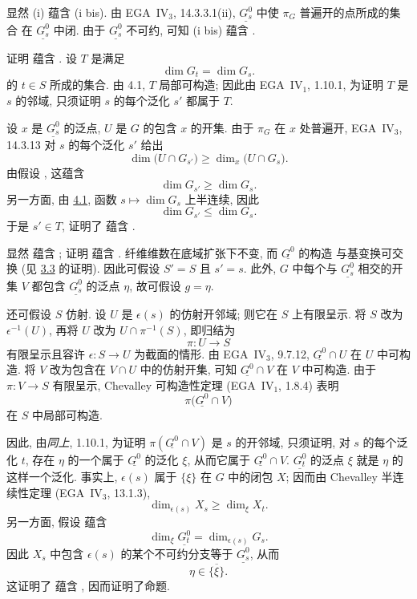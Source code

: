 显然 (i) 蕴含 (i bis). 由 EGA~IV\(_3\), 14.3.3.1(ii),
\(\underline{G_s^0}\) 中使 \(\pi_G\) 普遍开的点所成的集合
在 \(\underline{G_s^0}\) 中闭. 由于 \(\underline{G_s^0}\) 不可约,
可知 (i bis) 蕴含 .

证明  蕴含
.
设 \(T\) 是满足
\[
  \dim G_t=\dim G_s.
\]
的 \(t\in S\) 所成的集合. 由 4.1, \(T\) 局部可构造;
因此由 EGA~IV\(_1\), 1.10.1, 为证明 \(T\) 是 \(s\) 的邻域,
只须证明 \(s\) 的每个泛化 \(s'\) 都属于 \(T\).

设 \(x\) 是 \(\underline{G_s^0}\) 的泛点,
\(U\) 是 \(G\) 的包含 \(x\) 的开集.
由于 \(\pi_G\) 在 \(x\) 处普遍开,
EGA~IV\(_3\), 14.3.13 对 \(s\) 的每个泛化 \(s'\) 给出
\[
  \dim\bigl(U\cap G_{s'}\bigr)
    \geq \dim_x\bigl(U\cap G_s\bigr).
\]
由假设 , 这蕴含
\[
  \dim G_{s'}\geq\dim G_s.
\]
另一方面, 由 \hyperref[prop:sga3-VIB-4.1]{4.1},
函数 \(s\mapsto\dim G_s\) 上半连续, 因此
\[
  \dim G_{s'}\leq\dim G_s.
\]
于是 \(s'\in T\), 证明了 
蕴含 .

显然  蕴含
;
证明  蕴含
.
纤维维数在底域扩张下不变, 而 \(\underline{G^0}\) 的构造
与基变换可交换 (见 \hyperref[prop:sga3-VIB-3.3]{3.3} 的证明).
因此可假设 \(S'=S\) 且 \(s'=s\).
此外, \(G\) 中每个与 \(\underline{G_s^0}\) 相交的开集 \(V\)
都包含 \(\underline{G_s^0}\) 的泛点 \(\eta\), 故可假设 \(g=\eta\).

还可假设 \(S\) 仿射. 设 \(U\) 是 \(\epsilon(s)\) 的仿射开邻域;
则它在 \(S\) 上有限呈示. 将 \(S\) 改为 \(\epsilon^{-1}(U)\),
再将 \(U\) 改为 \(U\cap\pi^{-1}(S)\), 即归结为
\[
  \pi:U\longrightarrow S
\]
有限呈示且容许 \(\epsilon:S\to U\) 为截面的情形.
由 EGA~IV\(_3\), 9.7.12, \(\underline{G^0}\cap U\)
在 \(U\) 中可构造. 将 \(V\) 改为包含在 \(V\cap U\) 中的仿射开集,
可知 \(\underline{G^0}\cap V\) 在 \(V\) 中可构造.
由于 \(\pi:V\to S\) 有限呈示,
Chevalley 可构造性定理 (EGA~IV\(_1\), 1.8.4) 表明
\[
  \pi\bigl(\underline{G^0}\cap V\bigr)
\]
在 \(S\) 中局部可构造.

因此, 由\emph{同上}, 1.10.1, 为证明
\(\pi(\underline{G^0}\cap V)\) 是 \(s\) 的开邻域,
只须证明, 对 \(s\) 的每个泛化 \(t\), 存在 \(\eta\)
的一个属于 \(\underline{G^0}\) 的泛化 \(\xi\),
从而它属于 \(\underline{G^0}\cap V\).
\(\underline{G_t^0}\) 的泛点 \(\xi\) 就是 \(\eta\) 的这样一个泛化.
事实上, \(\epsilon(s)\) 属于 \(\{\xi\}\) 在 \(G\) 中的闭包 \(X\);
因而由 Chevalley 半连续性定理 (EGA~IV\(_3\), 13.1.3),
\[
  \dim_{\epsilon(s)}X_s\geq\dim_\xi X_t.
\]
另一方面, 假设  蕴含
\[
  \dim_\xi\underline{G_t^0}=\dim_{\epsilon(s)}G_s.
\]
因此 \(X_s\) 中包含 \(\epsilon(s)\) 的某个不可约分支等于
\(\underline{G_s^0}\), 从而
\[
  \eta\in\overline{\{\xi\}}.
\]
这证明了  蕴含
, 因而证明了命题.

